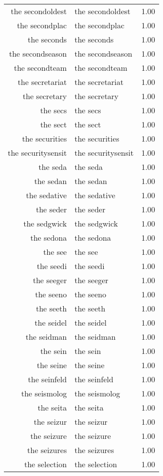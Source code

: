 \begin{table}[ht]
\begin{tabular}{rlr}
  the secondoldest & the secondoldest & 1.00 \\ 
  the secondplac & the secondplac & 1.00 \\ 
  the seconds & the seconds & 1.00 \\ 
  the secondseason & the secondseason & 1.00 \\ 
  the secondteam & the secondteam & 1.00 \\ 
  the secretariat & the secretariat & 1.00 \\ 
  the secretary & the secretary & 1.00 \\ 
  the secs & the secs & 1.00 \\ 
  the sect & the sect & 1.00 \\ 
  the securities & the securities & 1.00 \\ 
  the securitysensit & the securitysensit & 1.00 \\ 
  the seda & the seda & 1.00 \\ 
  the sedan & the sedan & 1.00 \\ 
  the sedative & the sedative & 1.00 \\ 
  the seder & the seder & 1.00 \\ 
  the sedgwick & the sedgwick & 1.00 \\ 
  the sedona & the sedona & 1.00 \\ 
  the see & the see & 1.00 \\ 
  the seedi & the seedi & 1.00 \\ 
  the seeger & the seeger & 1.00 \\ 
  the seeno & the seeno & 1.00 \\ 
  the seeth & the seeth & 1.00 \\ 
  the seidel & the seidel & 1.00 \\ 
  the seidman & the seidman & 1.00 \\ 
  the sein & the sein & 1.00 \\ 
  the seine & the seine & 1.00 \\ 
  the seinfeld & the seinfeld & 1.00 \\ 
  the seismolog & the seismolog & 1.00 \\ 
  the seita & the seita & 1.00 \\ 
  the seizur & the seizur & 1.00 \\ 
  the seizure & the seizure & 1.00 \\ 
  the seizures & the seizures & 1.00 \\ 
  the selection & the selection & 1.00 \\ 

\end{tabular}
\end{table}
